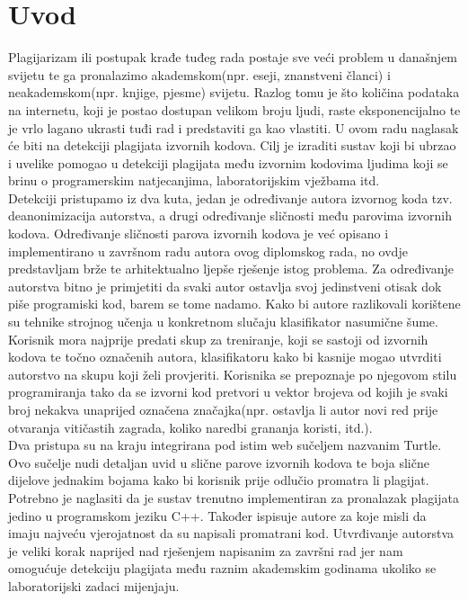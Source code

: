 \chapter*{Uvod}

	Plagijarizam ili postupak krađe tuđeg rada postaje sve veći problem u današnjem svijetu te ga pronalazimo akademskom(npr. eseji, znanstveni članci) i neakademskom(npr. knjige, pjesme) svijetu. Razlog tomu je što količina podataka na internetu, koji je postao dostupan velikom broju ljudi, raste eksponencijalno te je vrlo lagano ukrasti tuđi rad i predstaviti ga kao vlastiti. U ovom radu naglasak će biti na detekciji plagijata izvornih kodova. Cilj je izraditi sustav koji bi ubrzao i uvelike pomogao u detekciji plagijata među izvornim kodovima ljudima koji se brinu o programerskim natjecanjima, laboratorijskim vježbama itd. \\

	Detekciji pristupamo iz dva kuta, jedan je određivanje autora izvornog koda tzv. deanonimizacija autorstva, a drugi određivanje sličnosti među parovima izvornih kodova.   Određivanje sličnosti parova izvornih kodova je već opisano i implementirano u završnom radu autora ovog diplomskog rada, no ovdje predstavljam brže te arhitektualno ljepše rješenje istog problema. Za određivanje autorstva bitno je primjetiti da svaki autor ostavlja svoj jedinstveni otisak dok piše programiski kod, barem se tome nadamo. Kako bi autore razlikovali korištene su tehnike strojnog učenja u konkretnom slučaju klasifikator nasumične šume. Korisnik mora najprije predati skup za treniranje, koji se sastoji od izvornih kodova te točno označenih autora, klasifikatoru kako bi kasnije mogao utvrditi autorstvo na skupu koji želi provjeriti. Korisnika se prepoznaje po njegovom stilu programiranja tako da se izvorni kod pretvori u vektor brojeva od kojih je svaki broj nekakva unaprijed označena značajka(npr. ostavlja li autor novi red prije otvaranja vitičastih zagrada, koliko naredbi grananja koristi, itd.). \\

	Dva pristupa su na kraju integrirana pod istim web sučeljem nazvanim Turtle. Ovo sučelje nudi detaljan uvid u slične parove izvornih kodova te boja slične dijelove jednakim bojama kako bi korisnik prije odlučio promatra li plagijat. Potrebno je naglasiti da je sustav trenutno implementiran za pronalazak plagijata jedino u programskom jeziku C++.
\newpage
{}
\noindent Također ispisuje autore za koje misli da imaju najveću vjerojatnost da su napisali promatrani kod. Utvrđivanje autorstva je veliki korak naprijed nad rješenjem napisanim za završni rad jer nam omogućuje detekciju plagijata među raznim akademskim godinama ukoliko se laboratorijski zadaci mijenjaju.

